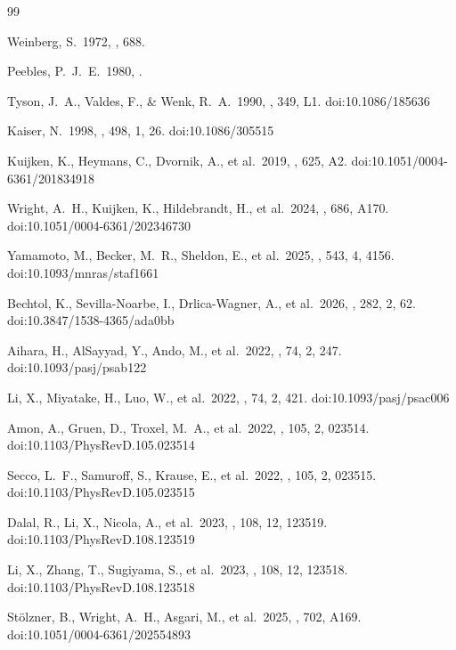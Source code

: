 \documentclass[a4paper, 11pt]{article}
\begin{document}
\begin{thebibliography}{99}

 Weinberg, S.\ 1972, , 688.

 Peebles, P.~J.~E.\ 1980, .

 Tyson, J.~A., Valdes, F., \& Wenk, R.~A.\ 1990, \apjl, 349, L1. doi:10.1086/185636

 Kaiser, N.\ 1998, \apj, 498, 1, 26. doi:10.1086/305515

 Kuijken, K., Heymans, C., Dvornik, A., et al.\ 2019, \aap, 625, A2. doi:10.1051/0004-6361/201834918

 Wright, A.~H., Kuijken, K., Hildebrandt, H., et al.\ 2024, \aap, 686, A170. doi:10.1051/0004-6361/202346730

 Yamamoto, M., Becker, M.~R., Sheldon, E., et al.\ 2025, \mnras, 543, 4, 4156. doi:10.1093/mnras/staf1661

 Bechtol, K., Sevilla-Noarbe, I., Drlica-Wagner, A., et al.\ 2026, \apjs, 282, 2, 62. doi:10.3847/1538-4365/ada0bb

 Aihara, H., AlSayyad, Y., Ando, M., et al.\ 2022, \pasj, 74, 2, 247. doi:10.1093/pasj/psab122

 Li, X., Miyatake, H., Luo, W., et al.\ 2022, \pasj, 74, 2, 421. doi:10.1093/pasj/psac006

 Amon, A., Gruen, D., Troxel, M.~A., et al.\ 2022, \prd, 105, 2, 023514. doi:10.1103/PhysRevD.105.023514

 Secco, L.~F., Samuroff, S., Krause, E., et al.\ 2022, \prd, 105, 2, 023515. doi:10.1103/PhysRevD.105.023515

 Dalal, R., Li, X., Nicola, A., et al.\ 2023, \prd, 108, 12, 123519. doi:10.1103/PhysRevD.108.123519

 Li, X., Zhang, T., Sugiyama, S., et al.\ 2023, \prd, 108, 12, 123518. doi:10.1103/PhysRevD.108.123518

 St{\"o}lzner, B., Wright, A.~H., Asgari, M., et al.\ 2025, \aap, 702, A169. doi:10.1051/0004-6361/202554893


\end{thebibliography}
\end{document}
